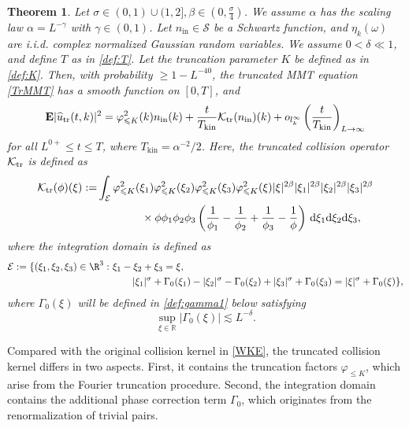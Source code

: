 \documentclass[UTF-8,reqno]{amsart}
\numberwithin{equation}{section}
\newtheorem{theorem}{Theorem}[section]
\theoremstyle{definition}
\def\dif{{\mathord{{\rm d}}}}
\def\geq{\geqslant}
\def\leq{\leqslant}
\def\dif{{\mathord{{\rm d}}}}
\def\geq{\geqslant}
\def\leq{\leqslant}
\begin{document}
\begin{theorem}\label{thm2}
Let $\sigma\in (0,1)\cup (1,2],\beta\in(0,\frac\sigma4)$. We assume  $\alpha$ has the scaling law $\alpha=L^{-\gamma}$ with $\gamma\in(0,1)$. Let $n_{\mathrm{in}} \in \mathcal S$ be a Schwartz function, and $\eta_{k}(\omega)$ are i.i.d. complex normalized   Gaussian random variables. We assume $0<\delta\ll1$, and   define $T$ as in \eqref{def:T}. 
Let the truncation parameter $K$ be defined as in \eqref{def:K}.  Then, with probability $\geq 1 - L^{-40}$, the truncated MMT equation \eqref{TrMMT}  has a smooth function on $[0,T]$, and
\begin{equation}\label{approx2}
\mathbf E |\widehat u_{\rm tr}(t, k)|^2 =\varphi_{\leq K}^2(k)n_{\mathrm{in}}(k)+\frac{t}{T_{\mathrm{kin}}}\mathcal K_{\rm tr}(n_{\mathrm{in}})(k)+o_{l^\infty_k}\left(\frac{t}{T_{\mathrm {kin}}}\right)_{L \to \infty}
\end{equation}
for all $L^{0+} \leq t \leq T$, where $T_{\mathrm{kin}}=\alpha^{-2}/2$. 
Here, the truncated collision operator $\mathcal K_{\rm tr}$ is defined as 
\begin{align}
    \mathcal K_{\rm tr}(\phi)(\xi):=& \int_{\mathcal{E}}\varphi_{\leq K}^2(\xi_1)\varphi_{\leq K}^2(\xi_2)\varphi_{\leq K}^2(\xi_3)\varphi_{\leq K}^2(\xi)|\xi|^{2\beta}|\xi_1|^{2\beta}|\xi_2|^{2\beta}|\xi_3|^{2\beta}\notag\\
    &\quad\quad\quad\quad\times \phi \phi_1 \phi_2 \phi_3\left(\frac{1}{\phi_1}-\frac{1}{\phi_2}+\frac{1}{\phi_3}-\frac{1}{\phi}\right)\, \dif \xi_1 \dif \xi_2 \dif \xi_3,\label{bd:ktr}
\end{align}
where the integration domain  is defined as \begin{align}
    \mathcal{E}:=\{(\xi_1, \xi_2, \xi_3)\in \R^{3}:&\ \xi_1-\xi_2+\xi_3=\xi,\notag\\ &\ \quad\quad |\xi_1|^\sigma+\Gamma_0(\xi_1)-|\xi_2|^\sigma-\Gamma_0(\xi_2)+|\xi_3|^\sigma+\Gamma_0(\xi_3)=|\xi|^\sigma+\Gamma_0(\xi)\},\notag%
\end{align}
where $\Gamma_0(\xi)$ will be defined in \eqref{def:gamma1} below satisfying $$\sup_{\xi\in\mathbb{R}}|\Gamma_0(\xi)|\lesssim   L^{-\delta}.$$%
\end{theorem}

Compared with the original collision kernel in \eqref{WKE}, 
the truncated collision kernel differs in two aspects. 
First, it contains the truncation factors $\varphi_{\leq K}$, 
which arise from the Fourier truncation procedure. 
Second, the integration domain contains the additional phase correction term $\Gamma_0$, 
which originates from the renormalization of trivial pairs.  
\end{document}
